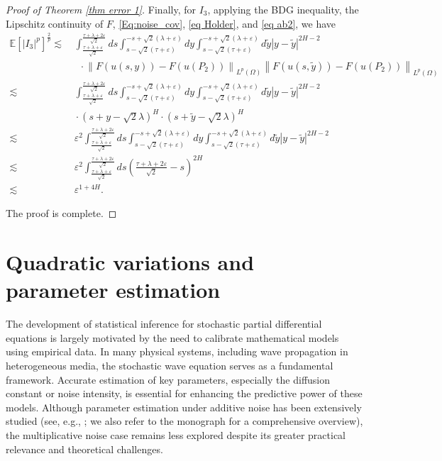 \documentclass[11pt,reqno]{amsart}
\numberwithin{equation}{section}
\newcommand{\1}{{\bf 1}}
\newcommand{\2}{{\bf 2}}
\begin{document}
\begin{proof}[Proof of Theorem \ref{thm error 1}]
 Finally, for $I_3$, applying the BDG  inequality, the Lipschitz continuity of $F$, \eqref{Eq:noise_cov}, \eqref{eq Holder},  and \eqref{eq ab2}, we have 
\begin{align*}
 \mathbb{E}\left[\left|I_3\right|^p\right]^{\frac{2}{p}}
 \lesssim &\,   \int_{\frac{\tau+\lambda+\varepsilon}{\sqrt 2}}^{\frac{\tau+\lambda+2\varepsilon}{\sqrt 2}}ds \int_{s-\sqrt{2}(\tau+\varepsilon)}^{-s+\sqrt 2(\lambda+ \varepsilon)} dy \int_{s-\sqrt{2}(\tau+\varepsilon)}^{-s+\sqrt 2(\lambda+ \varepsilon) }  d\tilde{y}  |y - \tilde{y}|^{2H-2}\\
& \ \ \ \cdot  \left\| F(u(s,y)) - F(u(P_2)) \right\|_{L^p(\Omega)}   
   \left\| F(u(s,\tilde y)) -  F(u(P_2)) \right\|_{L^p(\Omega)}  \\
\lesssim &\,   \int_{\frac{\tau+\lambda+\varepsilon}{\sqrt 2}}^{\frac{\tau+\lambda+2\varepsilon}{\sqrt 2}}ds \int_{s-\sqrt{2}(\tau+\varepsilon)}^{-s+\sqrt 2(\lambda+ \varepsilon)} dy \int_{s-\sqrt{2}(\tau+\varepsilon)}^{-s+\sqrt 2(\lambda+ \varepsilon) }  d\tilde{y}  |y - \tilde{y}|^{2H-2}\\
&\,   \cdot \left(  s+y-\sqrt{2}\lambda \right)^{H}  \cdot \left(  s+\tilde y-\sqrt{2}\lambda  \right)^{H}\\
 \lesssim &\,   \varepsilon^2 \int_{\frac{\tau+\lambda+\varepsilon}{\sqrt 2}}^{\frac{\tau+\lambda+2\varepsilon}{\sqrt 2}}ds \int_{s-\sqrt{2}(\tau+\varepsilon)}^{-s+\sqrt 2(\lambda+ \varepsilon)} dy \int_{s-\sqrt{2}(\tau+\varepsilon)}^{-s+\sqrt 2(\lambda+ \varepsilon) }  d\tilde{y}  |y - \tilde{y}|^{2H-2}\\
 \lesssim&\,       \varepsilon^2 \int_{\frac{\tau+\lambda+\varepsilon}{\sqrt 2}}^{\frac{\tau+\lambda+2\varepsilon}{\sqrt 2}}ds  \left(\frac{\tau+\lambda+2\varepsilon}{\sqrt 2}-s\right)^{2H}\\
 \lesssim&\,    \varepsilon^{1+4H}.
  \end{align*}


The proof is complete. 
\end{proof}


 
  
     
\section{Quadratic variations and parameter estimation}\label{QVPE}
  
  
  The development of statistical inference for stochastic partial differential equations   is  largely motivated by the need to calibrate mathematical models using empirical data.    In many physical systems, including  wave propagation in heterogeneous media, the stochastic wave equation serves as   a fundamental framework. Accurate  estimation  of key parameters, especially the   diffusion constant or noise intensity, is essential for    enhancing the  predictive power of these models.    Although parameter    estimation under  additive noise has been extensively studied (see, e.g., \cite{AGT2022, KT2018, KTZ2018, Shev2023};  we also refer to      the monograph \cite{T2023} for   a comprehensive overview),  the multiplicative noise case remains less explored despite its greater practical relevance and theoretical challenges.
   
\end{document}
